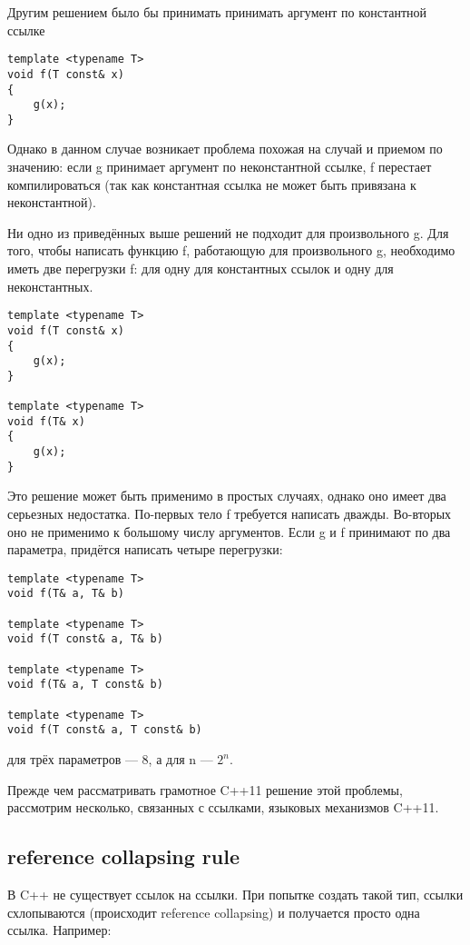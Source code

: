 Другим решением было бы принимать принимать аргумент по константной ссылке
\begin{verbatim}
template <typename T>
void f(T const& x)
{
    g(x);
}
\end{verbatim}

Однако в данном случае возникает проблема похожая на случай и приемом по значению: если g принимает аргумент по неконстантной ссылке, f перестает компилироваться (так как константная ссылка не может быть привязана к неконстантной).

Ни одно из приведённых выше решений не подходит для произвольного g. Для того, чтобы написать функцию f, работающую для произвольного g, необходимо иметь две перегрузки f: для одну для константных ссылок и одну для неконстантных.

\begin{verbatim}
template <typename T>
void f(T const& x)
{
    g(x);
}

template <typename T>
void f(T& x)
{
    g(x);
}
\end{verbatim}

Это решение может быть применимо в простых случаях, однако оно имеет два серьезных недостатка. По-первых тело f требуется написать дважды. Во-вторых оно не применимо к большому числу аргументов. Если g и f принимают по два параметра, придётся написать четыре перегрузки:

\begin{verbatim}
template <typename T>
void f(T& a, T& b)

template <typename T>
void f(T const& a, T& b)

template <typename T>
void f(T& a, T const& b)

template <typename T>
void f(T const& a, T const& b)
\end{verbatim}

для трёх параметров --- 8, а для n --- $2^n$.

Прежде чем рассматривать грамотное C++11 решение этой проблемы, рассмотрим несколько, связанных с ссылками, языковых механизмов C++11.

\subsection{reference collapsing rule}

В C++ не существует ссылок на ссылки. При попытке создать такой тип, ссылки схлопываются (происходит reference collapsing) и получается просто одна ссылка. Например:

